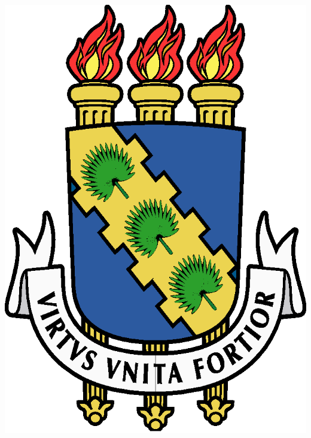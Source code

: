%
\begin{titlepage}
\begin{center}
\includegraphics[scale=0.33]{fig/logo_UFC.eps}\\
\vfill
{\MakeUppercase{\instituicao}}\par
{\MakeUppercase{\departamento}}\par
{\MakeUppercase{\curso}}\\
\vfill
\begin{center}
\Large\MakeUppercase{\titulo}\par
\end{center}
\vfill\vfill
\begin{center}
{\MakeUppercase{\autor}}
\end{center}
\vfill\vfill\vfill

\setlength{\parskip}{.3cm}
{\normalfont{\Local}} \par
{\normalfont{\Data}}
\end{center}
\end{titlepage}
